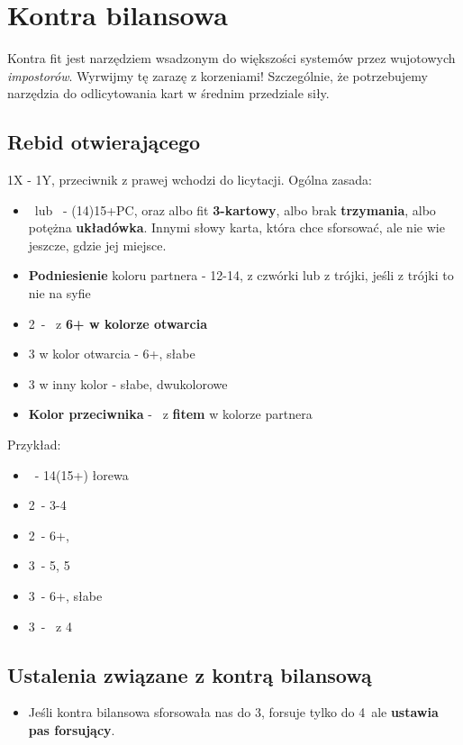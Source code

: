 \documentclass[12pt, a4paper]{article}
\begin{document}
\pagebreak
\section{Kontra bilansowa}
Kontra fit jest narzędziem wsadzonym do większości systemów przez wujotowych \emph{impostorów}. Wyrwijmy tę zarazę z korzeniami!
Szczególnie, że potrzebujemy narzędzia do odlicytowania kart w średnim przedziale siły.
\subsection{Rebid otwierającego}
1X - 1Y, przeciwnik z prawej wchodzi do licytacji.
Ogólna zasada:
\begin{itemize}
    \item \dbl\ lub \rdbl\ - (14)15+PC, oraz albo fit \textbf{3-kartowy}, albo brak \textbf{trzymania},
    albo potężna \textbf{układówka}. Innymi słowy karta,
    która chce sforsować, ale nie wie jeszcze, gdzie jej miejsce.

    \item \textbf{Podniesienie} koloru partnera - 12-14, z czwórki lub z trójki, jeśli z trójki to nie na syfie
    \item 2\nt\ - \inv\ z \textbf{6+ w kolorze otwarcia}
    \item 3 w kolor otwarcia - 6+, słabe
    \item 3 w inny kolor - słabe, dwukolorowe
    \item \textbf{Kolor przeciwnika} - \gf\ z \textbf{fitem} w kolorze partnera
\end{itemize}
Przykład:
\begin{itemize}
    \item \dbl\ - 14(15+) łorewa
    \item 2\spades\ - 3-4\spades
    \item 2\nt\ - 6+\diams, \inv
    \item 3\clubs\ - 5\diams, 5\clubs
    \item 3\diams\ - 6+\diams, słabe
    \item 3\hearts\ - \gf\ z 4\spades
\end{itemize}

\subsection{Ustalenia związane z kontrą bilansową}
\begin{itemize}
    \item Jeśli kontra bilansowa sforsowała nas do 3\nt, forsuje tylko do 4\minor\, ale \textbf{ustawia pas forsujący}.
\end{itemize}
\end{document}
